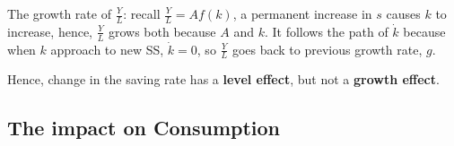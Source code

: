 \documentclass[12pt]{article}
\begin{document}
The growth rate of $ \frac{Y}{L} $:
recall $ \frac{Y}{L} = Af(k) $, a permanent increase in $ s $ causes $ k $ to increase,
hence, $ \frac{Y}{L} $ grows both because $ A $ and $ k $. It follows the path
of $ \dot{k} $ because when $ k $ approach to new SS, $ \dot{k} = 0 $, so $ \frac{Y}{L}
$ goes back to previous growth rate, $ g $.

Hence, change in the saving rate has a {\textbf {level effect}}, but not a 
{\textbf {growth effect}}.


\subsection{The impact on Consumption}
\end{document}
